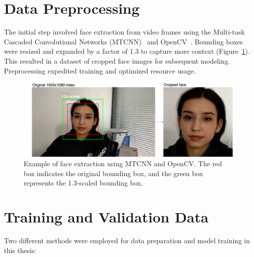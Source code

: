 \documentclass[a4paper,12pt,openright]{book}
\begin{document}
\section{Data Preprocessing}

The initial step involved face extraction from video frames using the Multi-task Cascaded Convolutional Networks (MTCNN)~\cite{DBLP:journals/corr/ZhangZL016} and OpenCV~\cite{opencv_library}. Bounding boxes were resized and expanded by a factor of 1.3 to capture more context (Figure~\ref{fig:MTCCN}). This resulted in a dataset of cropped face images for subsequent modeling. Preprocessing expedited training and optimized resource usage.


\begin{figure}[!htb]
    \centering
    \includegraphics[trim={0cm 0cm 0cm 0cm},clip,width=\textwidth]{images/resultof.png}
    \caption{Example of face extraction using MTCNN and OpenCV. The red box indicates the original bounding box, and the green box represents the 1.3-scaled bounding box.}

    \label{fig:MTCCN}
\end{figure}


\section{Training and Validation Data}

Two different methods were employed for data preparation and model training in this thesis:
\end{document}
